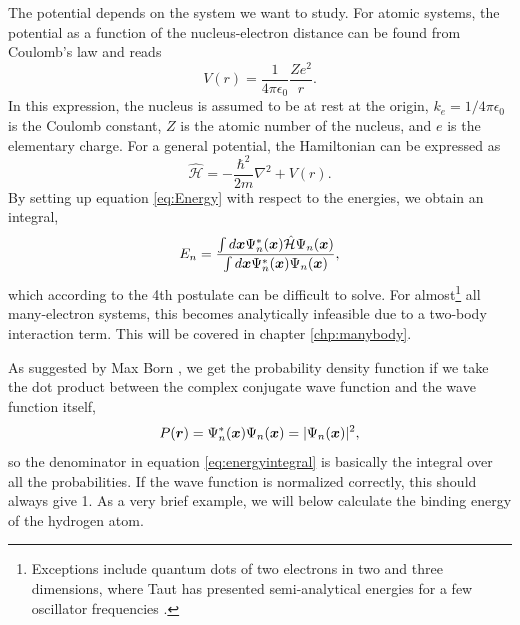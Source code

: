 The potential depends on the system we want to study. For atomic systems, the potential as a function of the nucleus-electron distance can be found from Coulomb's law and reads 
\begin{equation}
V(r)=\frac{1}{4\pi\epsilon_0}\frac{Ze^2}{r}.
\label{eq:atompotential}
\end{equation}
In this expression, the nucleus is assumed to be at rest at the origin, $k_e=1/4\pi\epsilon_0$ is the Coulomb constant, $Z$ is the atomic number of the nucleus, and $e$ is the elementary charge. For a general potential, the Hamiltonian can be expressed as 
\begin{equation}
\hat{\mathcal{H}}=-\frac{\hbar^2}{2m}\nabla^2+V(r).
\label{eq:oneparticlehamiltonian}
\end{equation}
By setting up equation \eqref{eq:Energy} with respect to the energies, we obtain an integral,
\begin{equation}
E_n=\frac{\int d\boldsymbol{{x}}\Psi_n^*(\boldsymbol{{x}})\hat{\mathcal{H}}\Psi_n(\boldsymbol{{x}})}{\int d\boldsymbol{{x}}\Psi_n^*(\boldsymbol{{x}})\Psi_n(\boldsymbol{{x}})},
\label{eq:energyintegral}
\end{equation}
which according to the 4th postulate can be difficult to solve. For almost\footnote{Exceptions include quantum dots of two electrons in two and three dimensions, where Taut has presented semi-analytical energies for a few oscillator frequencies \supercite{taut_two_1993,taut_two_1994}.} all many-electron systems, this becomes analytically infeasible due to a two-body interaction term. This will be covered in chapter \ref{chp:manybody}.

As suggested by Max Born \supercite{born_zur_1926}, we get the probability density function if we take the dot product between the complex conjugate wave function and the wave function itself,
\begin{equation}
P(\boldsymbol{{r}})=\Psi_n^*(\boldsymbol{{x}})\Psi_n(\boldsymbol{{x}})=|\Psi_n(\boldsymbol{{x}})|^2,
\label{eq:pdf}
\end{equation}
so the denominator in equation \eqref{eq:energyintegral} is basically the integral over all the probabilities. If the wave function is normalized correctly, this should always give 1. As a very brief example, we will below calculate the binding energy of the hydrogen atom.

